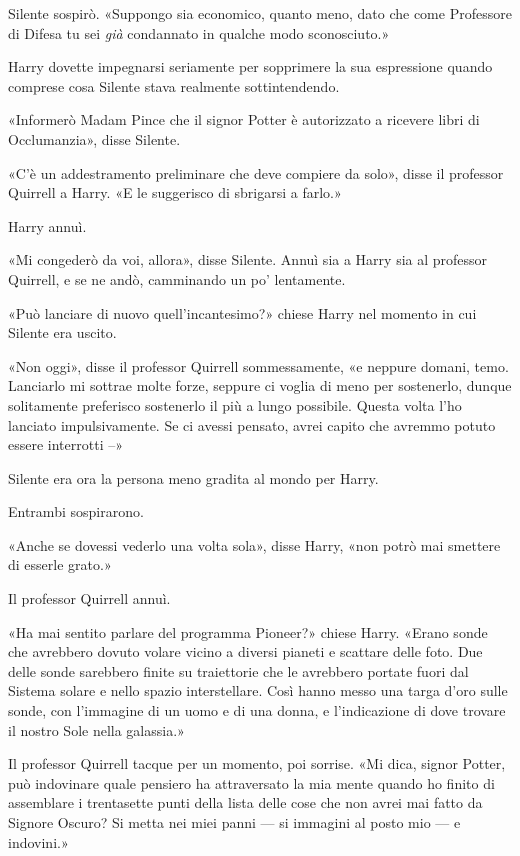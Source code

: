 Silente sospirò. «Suppongo sia economico, quanto meno, dato che come Professore di Difesa tu sei \textit{già} condannato in qualche modo sconosciuto.»

Harry dovette impegnarsi seriamente per sopprimere la sua espressione quando comprese cosa Silente stava realmente sottintendendo.

«Informerò Madam Pince che il signor Potter è autorizzato a ricevere libri di Occlumanzia», disse Silente.

«C’è un addestramento preliminare che deve compiere da solo», disse il professor Quirrell a Harry. «E le suggerisco di sbrigarsi a farlo.»

Harry annuì.

«Mi congederò da voi, allora», disse Silente. Annuì sia a Harry sia al professor Quirrell, e se ne andò, camminando un po’ lentamente.

«Può lanciare di nuovo quell’incantesimo?» chiese Harry nel momento in cui Silente era uscito.

«Non oggi», disse il professor Quirrell sommessamente, «e neppure domani, temo. Lanciarlo mi sottrae molte forze, seppure ci voglia di meno per sostenerlo, dunque solitamente preferisco sostenerlo il più a lungo possibile. Questa volta l’ho lanciato impulsivamente. Se ci avessi pensato, avrei capito che avremmo potuto essere interrotti –»

Silente era ora la persona meno gradita al mondo per Harry.

Entrambi sospirarono.

«Anche se dovessi vederlo una volta sola», disse Harry, «non potrò mai smettere di esserle grato.»

Il professor Quirrell annuì.

«Ha mai sentito parlare del programma Pioneer?» chiese Harry. «Erano sonde che avrebbero dovuto volare vicino a diversi pianeti e scattare delle foto. Due delle sonde sarebbero finite su traiettorie che le avrebbero portate fuori dal Sistema solare e nello spazio interstellare. Così hanno messo una targa d’oro sulle sonde, con l’immagine di un uomo e di una donna, e l’indicazione di dove trovare il nostro Sole nella galassia.»

Il professor Quirrell tacque per un momento, poi sorrise. «Mi dica, signor Potter, può indovinare quale pensiero ha attraversato la mia mente quando ho finito di assemblare i trentasette punti della lista delle cose che non avrei mai fatto da Signore Oscuro? Si metta nei miei panni — si immagini al posto mio — e indovini.»


